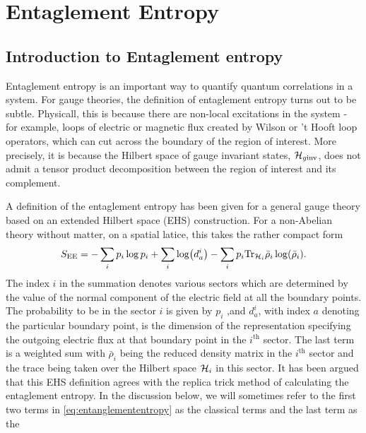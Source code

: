 \chapter{Entaglement Entropy}
\adjustmtc
\minitoc
\section{Introduction to Entaglement entropy}
Entaglement entropy is an important way to quantify quantum correlations in
a system. For gauge theories, the definition of entaglement entropy 
turns out to be subtle. Physicall, this is because there are non-local
excitations in the system - for example, loops of electric or magnetic
flux created by Wilson or 't Hooft loop operators, which can cut across
the boundary of the region of interest. More precisely, it is because
the Hilbert space of gauge invariant states, $\mathcal{H}_{g\mathrm{inv}}$, does
not admit a tensor product decomposition between the region of interest
and its complement.
\par A definition of the entaglement entropy has been given for a general gauge
theory based on an extended Hilbert space (EHS) construction. For a non-Abelian
theory without matter, on a spatial latice, this takes the rather compact form
\begin{equation}
  S_{\mathrm{EE}} = -\sum_i{p_i\log p_i}+\sum_i{\log(d^i_a)
    -\sum_i{p_i\mathrm{Tr}_{\mathcal{H}_i}\bar{\rho}_i\log(\bar{\rho}_i)}.
    }
    \label{eq:entanglemententropy}
\end{equation}
The index $i$ in the summation denotes various sectors which are determined
by the value of the normal component of the electric field at all the
boundary points. The probability to be in the sector $i$ is given by $p_i$
,and $d_a^i$, with index $a$ denoting the particular boundary point, is the
dimension of the representation specifying the outgoing electric flux at that
boundary point in the $i^{\mathrm{th}}$ sector. The last term is a weighted sum
with $\bar{\rho}_i$ being the reduced density matrix in the $i^{\mathrm{th}}$
sector and the trace being taken over the Hilbert space $\mathcal{H}_i$ in this
sector. It has been argued that this EHS definition agrees with the
replica trick method of calculating the entaglement entropy. In the discussion
below, we will sometimes refer to the first two terms in
\eqref{eq:entanglemententropy} as the classical terms and the last term as the
